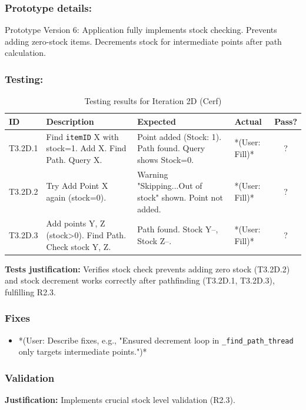\subsubsection{Prototype details:}
Prototype Version 6: Application fully implements stock checking. Prevents adding zero-stock items. Decrements stock for intermediate points after path calculation.

\subsubsection{Testing:}
\begin{table}[htbp]
	\centering
	\begin{tabularx}{\textwidth}{|l|X|p{4.5cm}|p{1.5cm}|c|}
		\hline
		\textbf{ID} & \textbf{Description} & \textbf{Expected} & \textbf{Actual} & \textbf{Pass?} \\
		\hline
		T3.2D.1 & Find \verb|itemID| X with stock=1. Add X. Find Path. Query X. & Point added (Stock: 1). Path found. Query shows Stock=0. & *(User: Fill)* & ? \\
		\hline
		T3.2D.2 & Try Add Point X again (stock=0). & Warning "Skipping...Out of stock" shown. Point not added. & *(User: Fill)* & ? \\
		\hline
		T3.2D.3 & Add points Y, Z (stock>0). Find Path. Check stock Y, Z. & Path found. Stock Y--, Stock Z--. & *(User: Fill)* & ? \\
		\hline
	\end{tabularx}
	\caption{Testing results for Iteration 2D (Cerf)}
\end{table}
\textbf{Tests justification:} Verifies stock check prevents adding zero stock (T3.2D.2) and stock decrement works correctly after pathfinding (T3.2D.1, T3.2D.3), fulfilling R2.3.

\subsubsection{Fixes}
\begin{itemize}
	\item *(User: Describe fixes, e.g., "Ensured decrement loop in \verb|_find_path_thread| only targets intermediate points.")*
\end{itemize}

\subsubsection{Validation}
	\begin{itemize}
		\item \textbf{Stock Availability Check: Check 'quantity > 0' added to \verb|gui.add_point|.
		\item \textbf{Decrement Safety: Check 'Quantity > 0' added to \verb|database.decrement_quantity|.
	\end{itemize}
	\textbf{Justification:} Implements crucial stock level validation (R2.3).
	

